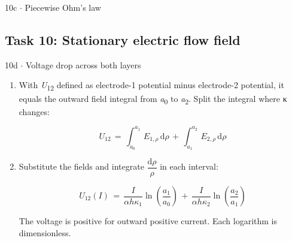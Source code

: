 \documentclass[11pt]{article}
\begin{document}
\begin{keepsection}
\begin{workedbox}{10c \ensuremath{\cdot} Piecewise Ohm’s law}
\begin{enumerate}
\begin{center}
\begin{minipage}[t]{0.950\linewidth}
\par{}\end{minipage}
\end{center}
\end{enumerate}
\end{workedbox}

\end{keepsection}
\begin{keepsection}\subsection{Task 10: Stationary electric flow field}

\begin{workedbox}{10d \ensuremath{\cdot} Voltage drop across both layers}
\begin{enumerate}
\item {}
With \textit{U}\textsubscript{12} defined as electrode-1 potential minus electrode-2 potential, it equals the outward field integral from \textit{a}\textsubscript{0} to \textit{a}\textsubscript{2}. Split the integral where κ changes:

\begin{equation*}{U}_{12}\, =\, \int_{{a}_{0}}^{{a}_{1}} \, {E}_{1,ρ}\, \mathrm{d}ρ\, +\, \int_{{a}_{1}}^{{a}_{2}} \, {E}_{2,ρ}\, \mathrm{d}ρ\end{equation*}
\item {}
Substitute the fields and integrate {\small\ensuremath{\dfrac{\mathrm{d}ρ}{ρ}}} in each interval:

\begin{equation*}{U}_{12}({I})\, =\, \dfrac{{I}}{α{h}κ_{1}}\ln \left(\dfrac{{a}_{1}}{{a}_{0}}\right)\, +\, \dfrac{{I}}{α{h}κ_{2}}\ln \left(\dfrac{{a}_{2}}{{a}_{1}}\right)\end{equation*}

The voltage is positive for outward positive current. Each logarithm is dimensionless.
\end{enumerate}
\end{workedbox}

\end{keepsection}
\end{document}
